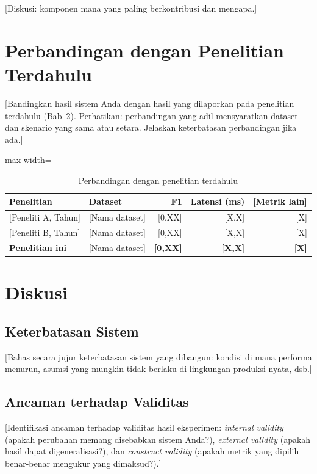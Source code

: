 [Diskusi: komponen mana yang paling berkontribusi dan mengapa.]

\section{Perbandingan dengan Penelitian Terdahulu}
\label{sec:6.5}

[Bandingkan hasil sistem Anda dengan hasil yang dilaporkan pada penelitian terdahulu
(Bab~2). Perhatikan: perbandingan yang adil mensyaratkan dataset dan skenario yang sama
atau setara. Jelaskan keterbatasan perbandingan jika ada.]

\begin{table}[H]
  \centering
  \caption{Perbandingan dengan penelitian terdahulu}
  \label{tab:6.komparasi}
  \begin{adjustbox}{max width=\textwidth}
  \begin{tabular}{lp{2.8cm}rrr}
    \toprule
    \textbf{Penelitian} & \textbf{Dataset} & \textbf{F1} & \textbf{Latensi (ms)}
                        & \textbf{[Metrik lain]} \\
    \midrule
    {[Peneliti A, Tahun]} & [Nama dataset] & [0,XX] & [X,X] & [X] \\
    {[Peneliti B, Tahun]} & [Nama dataset] & [0,XX] & [X,X] & [X] \\
    \textbf{Penelitian ini} & [Nama dataset] & \textbf{[0,XX]} & \textbf{[X,X]} & \textbf{[X]} \\
    \bottomrule
  \end{tabular}
  \end{adjustbox}
\end{table}

\section{Diskusi}
\label{sec:6.6}

\subsection{Keterbatasan Sistem}
\label{sec:6.6.1}

[Bahas secara jujur keterbatasan sistem yang dibangun: kondisi di mana performa menurun,
asumsi yang mungkin tidak berlaku di lingkungan produksi nyata, dsb.]

\subsection{Ancaman terhadap Validitas}
\label{sec:6.6.2}

[Identifikasi ancaman terhadap validitas hasil eksperimen: \emph{internal validity}
(apakah perubahan memang disebabkan sistem Anda?), \emph{external validity} (apakah
hasil dapat digeneralisasi?), dan \emph{construct validity} (apakah metrik yang dipilih
benar-benar mengukur yang dimaksud?).]
